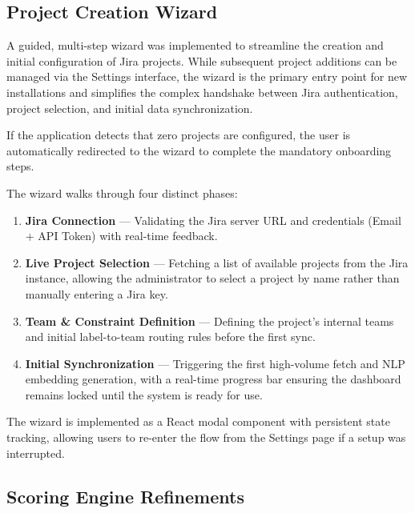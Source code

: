 \documentclass[12pt, a4paper]{article}
\begin{document}
\subsection{Project Creation Wizard}

A guided, multi-step wizard was implemented to streamline the creation and initial configuration of Jira projects. While subsequent project additions can be managed via the Settings interface, the wizard is the primary entry point for new installations and simplifies the complex handshake between Jira authentication, project selection, and initial data synchronization.

If the application detects that zero projects are configured, the user is automatically redirected to the wizard to complete the mandatory onboarding steps.

The wizard walks through four distinct phases:

\begin{enumerate}
    \item \textbf{Jira Connection} — Validating the Jira server URL and credentials (Email + API Token) with real-time feedback.
    \item \textbf{Live Project Selection} — Fetching a list of available projects from the Jira instance, allowing the administrator to select a project by name rather than manually entering a Jira key.
    \item \textbf{Team \& Constraint Definition} — Defining the project's internal teams and initial label-to-team routing rules before the first sync.
    \item \textbf{Initial Synchronization} — Triggering the first high-volume fetch and NLP embedding generation, with a real-time progress bar ensuring the dashboard remains locked until the system is ready for use.
\end{enumerate}

The wizard is implemented as a React modal component with persistent state tracking, allowing users to re-enter the flow from the Settings page if a setup was interrupted.


\subsection{Scoring Engine Refinements}
\label{sec:scoring-refinements}
\end{document}
